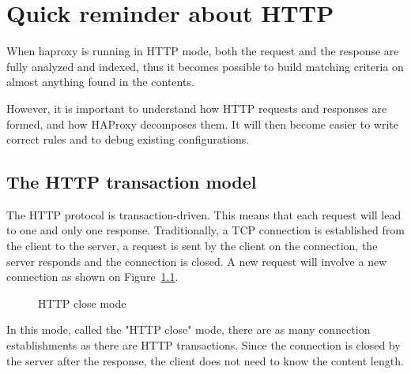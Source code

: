 \chapter{Quick reminder about HTTP}
When haproxy is running in HTTP mode, both the request and the response are
fully analyzed and indexed, thus it becomes possible to build matching criteria
on almost anything found in the contents.

However, it is important to understand how HTTP requests and responses are
formed, and how HAProxy decomposes them. It will then become easier to write
correct rules and to debug existing configurations.

\section{The HTTP transaction model}
The HTTP protocol is transaction-driven. This means that each request will lead
to one and only one response. Traditionally, a TCP connection is established
from the client to the server, a request is sent by the client on the
connection, the server responds and the connection is closed. A new request
will involve a new connection as shown on Figure~\ref{fig:http_close}.

\begin{figure}[!ht]
\centering
{}

\caption{HTTP close mode}
\label{fig:http_close}
\end{figure}

In this mode, called the "HTTP close" mode, there are as many connection
establishments as there are HTTP transactions. Since the connection is closed
by the server after the response, the client does not need to know the content
length.

